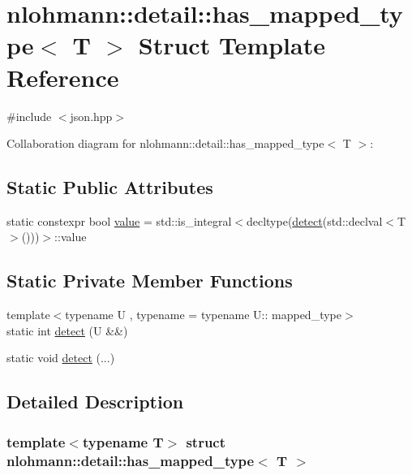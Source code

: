 \hypertarget{structnlohmann_1_1detail_1_1has__mapped__type}{}\section{nlohmann\+:\+:detail\+:\+:has\+\_\+mapped\+\_\+type$<$ T $>$ Struct Template Reference}
\label{structnlohmann_1_1detail_1_1has__mapped__type}


{\ttfamily \#include $<$json.\+hpp$>$}



Collaboration diagram for nlohmann\+:\+:detail\+:\+:has\+\_\+mapped\+\_\+type$<$ T $>$\+:
\subsection*{Static Public Attributes}
\begin{DoxyCompactItemize}
\item 
static constexpr bool \hyperlink{structnlohmann_1_1detail_1_1has__mapped__type_aa7bb3b246c9c936fa6aca4d9b7cda5a2}{value} = std\+::is\+\_\+integral$<$decltype(\hyperlink{structnlohmann_1_1detail_1_1has__mapped__type_aedb1b3019f656eb415cbe0b77d7546c4}{detect}(std\+::declval$<$T$>$()))$>$\+::value
\end{DoxyCompactItemize}
\subsection*{Static Private Member Functions}
\begin{DoxyCompactItemize}
\item 
{\footnotesize template$<$typename U , typename  = typename U\+:: mapped\+\_\+type$>$ }\\static int \hyperlink{structnlohmann_1_1detail_1_1has__mapped__type_aedb1b3019f656eb415cbe0b77d7546c4}{detect} (U \&\&)
\item 
static void \hyperlink{structnlohmann_1_1detail_1_1has__mapped__type_a54257c3ddcabf59a50eaad029e59b75c}{detect} (...)
\end{DoxyCompactItemize}


\subsection{Detailed Description}
\subsubsection*{template$<$typename T$>$\newline
struct nlohmann\+::detail\+::has\+\_\+mapped\+\_\+type$<$ T $>$}



